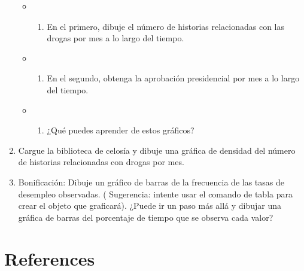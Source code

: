 \documentclass[
]{book}
\providecommand{\tightlist}{%
  \setlength{\itemsep}{0pt}\setlength{\parskip}{0pt}}
\begin{document}
\begin{enumerate}
  \begin{itemize}
  \item
    \begin{enumerate}
    \def\labelenumii{(\alph{enumii})}
    \tightlist
    \item
      En el primero, dibuje el número de historias relacionadas con las drogas por mes a lo largo del tiempo.
    \end{enumerate}
  \item
    \begin{enumerate}
    \def\labelenumii{(\alph{enumii})}
    \setcounter{enumii}{1}
    \tightlist
    \item
      En el segundo, obtenga la aprobación presidencial por mes a lo largo del tiempo.
    \end{enumerate}
  \item
    \begin{enumerate}
    \def\labelenumii{(\alph{enumii})}
    \setcounter{enumii}{2}
    \tightlist
    \item
      ¿Qué puedes aprender de estos gráficos?
    \end{enumerate}
  \end{itemize}
\item
  Cargue la biblioteca de celosía y dibuje una gráfica de densidad del número de historias relacionadas con drogas por mes.
\item
  Bonificación: Dibuje un gráfico de barras de la frecuencia de las tasas de desempleo observadas. ( Sugerencia: intente usar el comando de tabla para crear el objeto que graficará). ¿Puede ir un paso más allá y dibujar una gráfica de barras del porcentaje de tiempo que se observa cada valor?
\end{enumerate}

\hypertarget{references}{%
\section*{References}\label{references}}
\end{document}

